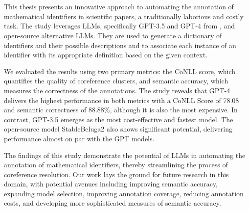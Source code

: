 \chapter{\abstractname}

This thesis presents an innovative approach to automating the annotation of mathematical identifiers in scientific papers, a traditionally laborious and costly task. The study leverages \ac{LLMs}, specifically GPT-3.5 and GPT-4 from \citet{openai2023}, and open-source alternative \ac{LLMs}. They are used to generate a dictionary of identifiers and their possible descriptions and to associate each instance of an identifier with its appropriate definition based on the given context. 

We evaluated the results using two primary metrics: the CoNLL score, which quantifies the quality of coreference clusters, and semantic accuracy, which measures the correctness of the annotations. The study reveals that GPT-4 delivers the highest performance in both metrics with a CoNLL Score of 78.08 and semantic correctness of 88.88\%, although it is also the most expensive. In contrast, GPT-3.5 emerges as the most cost-effective and fastest model. The open-source model StableBeluga2 also shows significant potential, delivering performance almost on par with the GPT models.

The findings of this study demonstrate the potential of LLMs in automating the annotation of mathematical identifiers, thereby streamlining the process of coreference resolution. Our work lays the ground for future research in this domain, with potential avenues including improving semantic accuracy, expanding model selection, improving annotation coverage, reducing annotation costs, and developing more sophisticated measures of semantic accuracy.